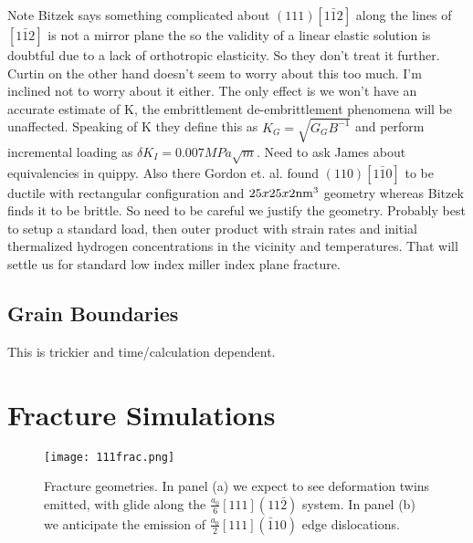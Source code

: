 \documentclass{article}
\begin{document}
Note Bitzek says something complicated about $(111)[1\bar{1}2]$ along the lines of
$[1\bar{1}2]$ is not a mirror plane the so the validity of a
linear elastic solution is doubtful due to a lack of orthotropic elasticity. So
they don't treat it further. Curtin on the other hand doesn't seem to worry about this
too much. I'm inclined not to worry about it either. The only effect is we won't have
an accurate estimate of K, the embrittlement de-embrittlement phenomena will be unaffected.
Speaking of K they define this as  $K_{G}=\sqrt{G_{G}B^{-1}}$ and perform incremental
loading as $\delta K_{I}=0.007 MPa \sqrt{m}$. Need to ask James about equivalencies in quippy.
Also there Gordon et. al. found $(110)[1\bar{1}0]$ to be ductile with rectangular configuration
and $25x25x2{\rm nm}^{3}$ geometry whereas Bitzek finds it to be brittle. So need to be careful we
justify the geometry. Probably best to setup a standard load, then outer product with
strain rates and initial thermalized hydrogen concentrations in the vicinity and temperatures.
That will settle us for standard low index miller index plane fracture.

\subsection{Grain Boundaries}
This is trickier and time/calculation dependent.

\section{Fracture Simulations}
\begin{figure}[!tbp]
\begin{center}
\texttt{[image: 111frac.png]}
\caption{Fracture geometries. In panel (a) we expect to see deformation twins
emitted, with glide along the $\frac{a_{0}}{6}[111](11\bar{2})$ system. In panel
(b) we anticipate the emission of $\frac{a_{0}}{2}[111](\bar{1}10)$ edge dislocations.
\label{fig:fracgeoms}}
\end{center}
\end{figure}

\scriptsize


\end{document}
